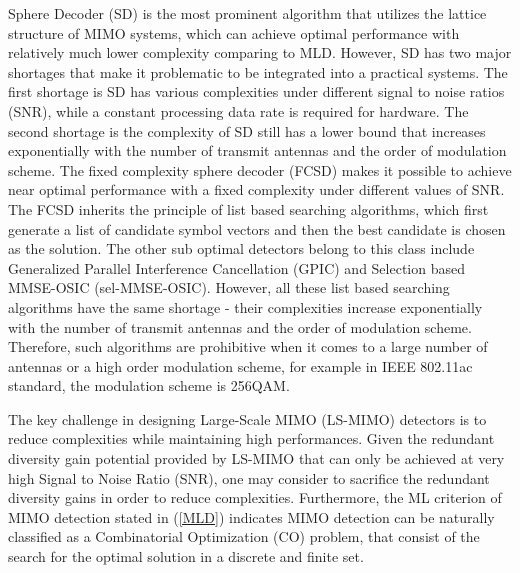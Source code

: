 Sphere Decoder (SD)\cite{damen2003maximum} is the most prominent algorithm that utilizes the lattice structure of MIMO systems, which can achieve optimal performance with relatively much lower complexity comparing to MLD. However, SD has two major shortages that make it problematic to be integrated into a practical systems. The first shortage is SD has various complexities under different signal to noise ratios (SNR), while a constant processing data rate is required for hardware. The second shortage is the complexity of SD still has a lower bound that increases exponentially with the number of transmit antennas and the order of modulation scheme\cite{jalden2005complexity}.
The fixed complexity sphere decoder (FCSD)\cite{barbero2008fixing} makes it possible to achieve near optimal performance with a fixed complexity under different values of SNR. The FCSD inherits the principle of list based searching algorithms, which first generate a list of candidate symbol vectors and then the best candidate is chosen as the solution. The other sub optimal detectors belong to this class include Generalized Parallel Interference Cancellation (GPIC)\cite{luo2008generalized} and Selection based MMSE-OSIC (sel-MMSE-OSIC)\cite{radji2009interference}. However, all these list based searching algorithms have the same shortage - their complexities increase exponentially with the number of transmit antennas and the order of modulation scheme\cite{radji2009interference}. Therefore, such algorithms are prohibitive when it comes to a large number of antennas or a high order modulation scheme, for example in IEEE 802.11ac standard\cite{IEEE802.11ac}, the modulation scheme is 256QAM. 
 
The key challenge in designing Large-Scale MIMO (LS-MIMO) detectors is to reduce complexities while maintaining high performances. Given the redundant diversity gain potential provided by LS-MIMO\cite{oestges2010mimo} that can only be achieved at very high Signal to Noise Ratio (SNR), one may consider to sacrifice the redundant diversity gains in order to reduce complexities. Furthermore, the ML criterion of MIMO detection stated in (\ref{MLD}) indicates MIMO detection can be naturally classified as a Combinatorial Optimization (CO) problem, that consist of the search for the optimal solution in a discrete and finite set. 

